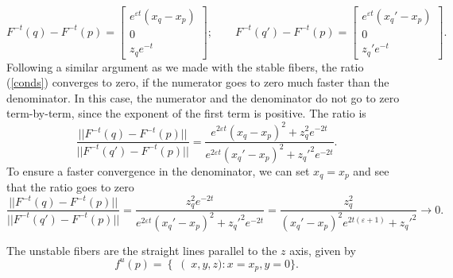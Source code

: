 \documentclass[a4paper,11pt,pdftex]{article}
\begin{document}
\begin{equation}
\label{eqdiffback}
F^{-t}(q) - F^{-t}(p) = \begin{bmatrix}
e^{\varepsilon t} \left(x_q  - x_p \right)\\
0 \\
z_q e^{-t}
\end{bmatrix}; \qquad  F^{-t}(q') - F^{-t}(p) = \begin{bmatrix}
e^{\varepsilon t} \left(x_q' - x_p \right)\\
0 \\
z_q' e^{-t}
\end{bmatrix}.
\end{equation}
Following a similar argument as we made with the stable fibers, the ratio (\ref{conds}) converges to zero, if the numerator goes to zero much faster than the denominator. In this case, the numerator and the denominator do not go to zero term-by-term, since the exponent of the first term is positive. The ratio is 
$$
    \frac{||F^{-t}(q) - F^{-t}(p)||}{||F^{-t}(q') - F^{-t}(p)||} = \frac{e^{2\varepsilon t}(x_q-x_p)^2 + z_q^2 e^{-2t}}{e^{2\varepsilon t}(x_q'-x_p)^2 + z_q'^2 e^{-2t}}.
$$
To ensure a faster convergence in the denominator, we can set $x_q = x_p$ and see that the ratio goes to zero
$$
    \frac{||F^{-t}(q) - F^{-t}(p)||}{||F^{-t}(q') - F^{-t}(p)||} = \frac{z_q^2 e^{-2t}}{e^{2\varepsilon t}(x_q'-x_p)^2 + z_q'^2 e^{-2t}} = \frac{z_q^2 }{(x_q'-x_p)^2e^{2t(\varepsilon +1)} + z_q'^2} \to 0.
$$

The unstable fibers are the straight lines parallel to the $z$ axis, given by
$$
f^u(p) = \left \{ \right (x,y,z) : x = x_p, y=0\}.
$$
\end{document}
